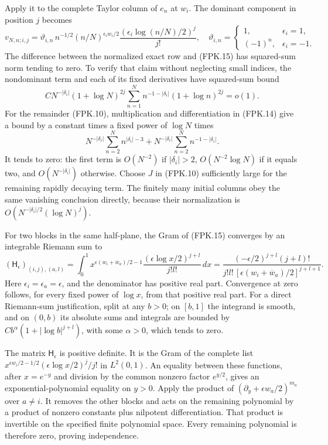 \documentclass[11pt,a4paper]{article}
\begin{document}
Apply it to the complete Taylor column of $e_n$ at $w_i$. The
dominant component in position $j$ becomes
\[
 v_{N,n;i,j}
  =\vartheta_{i,n}\,n^{-1/2}(n/N)^{\epsilon_iw_i/2}
             \frac{(\epsilon_i\log(n/N)/2)^j}{j!},
 \quad
 \vartheta_{i,n}=\begin{cases}1,&\epsilon_i=1,\\(-1)^n,&\epsilon_i=-1.
 \end{cases}
 \tag{FPK.15}
\]
The difference between the normalized exact row and (FPK.15) has
squared-sum norm tending to zero. To verify that
claim without neglecting small indices, the nondominant term and
each of its fixed derivatives have squared-sum bound
\[
 C N^{-|\delta_i|}(1+\log N)^{2j}
       \sum_{n=1}^N n^{-1-|\delta_i|}(1+\log n)^{2j}=o(1).
\]
For the remainder (FPK.10), multiplication and differentiation in
(FPK.14) give a bound by a constant times a fixed power of $\log N$
times
\[
 N^{-|\delta_i|}\sum_{n=2}^N n^{|\delta_i|-3}
       +N^{-|\delta_i|}\sum_{n=2}^N n^{-1-|\delta_i|}.
\]
It tends to zero: the first term is $O(N^{-2})$ if
$|\delta_i|>2$, $O(N^{-2}\log N)$ if it equals two, and
$O(N^{-|\delta_i|})$ otherwise. Choose $J$ in (FPK.10) sufficiently
large for the remaining rapidly decaying term. The finitely many
initial columns obey the same vanishing conclusion directly, because
their normalization is $O(N^{-|\delta_i|/2}(\log N)^j)$.

For two blocks in the same half-plane, the Gram of (FPK.15) converges
by an integrable Riemann sum to
\[
 (\mathsf H_\epsilon)_{(i,j),(a,l)}
  =\int_0^1 x^{\epsilon(w_i+\overline w_a)/2-1}
       \frac{(\epsilon\log x/2)^{j+l}}{j!l!}\,dx
  =\frac{(-\epsilon/2)^{j+l}(j+l)!}
      {j!l!\,[\epsilon(w_i+\overline w_a)/2]^{j+l+1}}.
 \tag{FPK.16}
\]
Here $\epsilon_i=\epsilon_a=\epsilon$, and the denominator has
positive real part. Convergence at zero follows, for every fixed
power of $\log x$, from that positive real part. For a direct
Riemann-sum justification, split at any $b>0$; on $[b,1]$ the
integrand is smooth, and on $(0,b)$ its absolute sums and integrals
are bounded by $C b^\alpha(1+|\log b|^{j+l})$, with some
$\alpha>0$, which tends to zero.

The matrix $\mathsf H_\epsilon$ is positive definite. It is the
Gram of the complete list
$x^{\epsilon w_i/2-1/2}(\epsilon\log x/2)^j/j!$ in $L^2(0,1)$.
An equality between these functions, after $x=e^{-y}$ and division
by the common nonzero factor $e^{y/2}$, gives an
exponential-polynomial equality on $y>0$. Apply the product of
$(\partial_y+\epsilon w_a/2)^{m_a}$ over $a\ne i$.
It removes the other blocks and acts on the remaining polynomial
by a product of nonzero constants plus nilpotent differentiation.
That product is invertible on the specified finite polynomial space.
Every remaining polynomial is therefore zero, proving independence.
\end{document}
